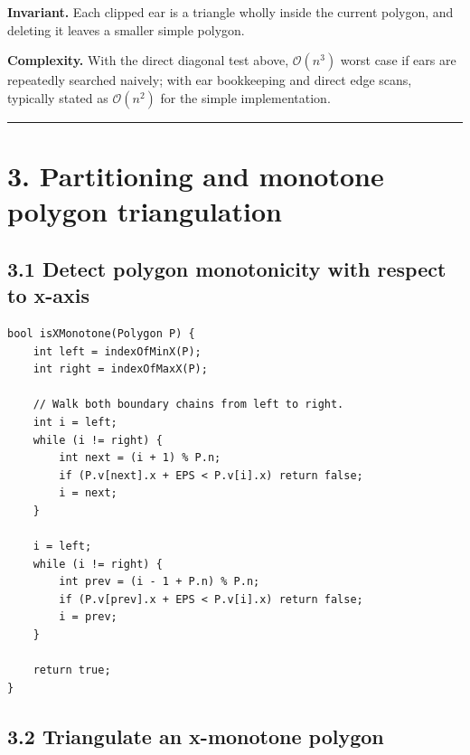 \documentclass[11pt]{article}
\begin{document}
\textbf{Invariant.} Each clipped ear is a triangle wholly inside the
current polygon, and deleting it leaves a smaller simple polygon.

\textbf{Complexity.} With the direct diagonal test above,
\(\mathcal{O}(n^3)\) worst case if ears are repeatedly
searched naively; with ear bookkeeping and direct edge scans, typically
stated as \(\mathcal{O}(n^2)\) for the simple
implementation.

\begin{center}\rule{0.5\linewidth}{0.5pt}\end{center}

\section{3. Partitioning and monotone polygon
triangulation}\label{partitioning-and-monotone-polygon-triangulation}

\subsection{3.1 Detect polygon monotonicity with respect to
x-axis}\label{detect-polygon-monotonicity-with-respect-to-x-axis}

\begin{verbatim}
bool isXMonotone(Polygon P) {
    int left = indexOfMinX(P);
    int right = indexOfMaxX(P);

    // Walk both boundary chains from left to right.
    int i = left;
    while (i != right) {
        int next = (i + 1) % P.n;
        if (P.v[next].x + EPS < P.v[i].x) return false;
        i = next;
    }

    i = left;
    while (i != right) {
        int prev = (i - 1 + P.n) % P.n;
        if (P.v[prev].x + EPS < P.v[i].x) return false;
        i = prev;
    }

    return true;
}
\end{verbatim}

\subsection{3.2 Triangulate an x-monotone
polygon}\label{triangulate-an-x-monotone-polygon}
\end{document}
